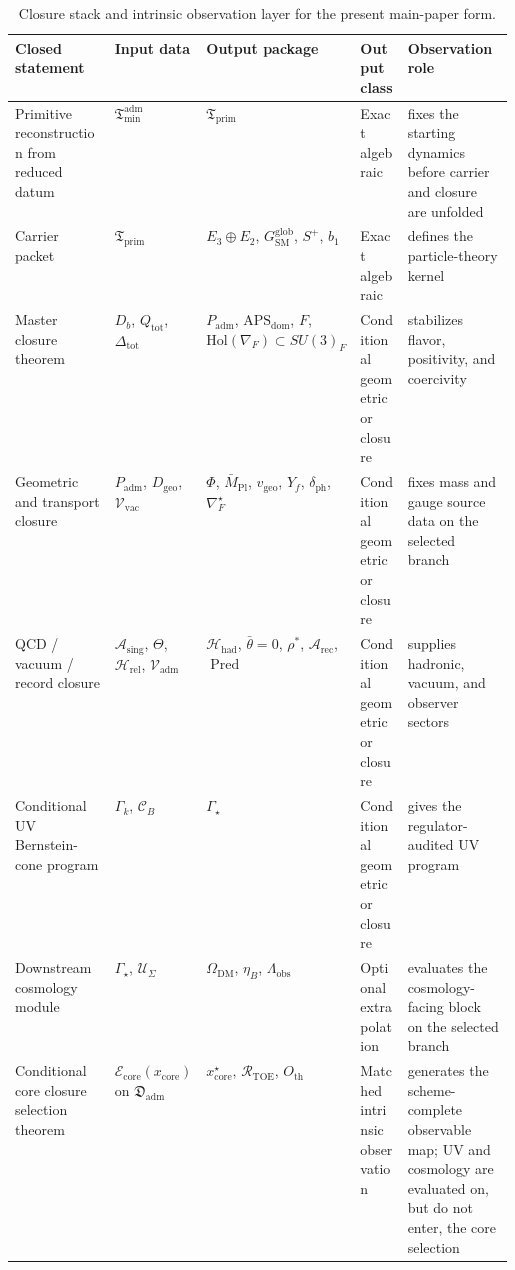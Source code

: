 \documentclass[11pt,a4paper]{article}
\theoremstyle{definition}
\theoremstyle{remark}
\newcommand{\Seam}{\Sigma}
\newcommand{\Mpl}{\bar M_{\mathrm{Pl}}}
\newcommand{\bone}{b_1}
\newcommand{\Arec}{\mathcal A_{\mathrm{rec}}}
\newcommand{\Asing}{\mathcal A_{\mathrm{sing}}}
\newcommand{\Vadm}{\mathcal V_{\mathrm{adm}}}
\newcommand{\Hrel}{\mathcal H_{\mathrm{rel}}}
\newcommand{\Hhad}{\mathcal H_{\mathrm{had}}}
\newcommand{\Pred}{\operatorname{Pred}}
\newcommand{\Tmin}{\mathfrak T_{\mathrm{min}}}
\newcommand{\Tprim}{\mathfrak T_{\mathrm{prim}}}
\newcommand{\APSdom}{\mathrm{APS}_{\mathrm{dom}}}
\newcommand{\vgeo}{v_{\mathrm{geo}}}
\newcommand{\Padm}{P_{\mathrm{adm}}}
\begin{document}
\begin{table}[t]
\centering
\small
\begin{tabularx}{\linewidth}{@{}>{\raggedright\arraybackslash}p{0.20\linewidth}>{\raggedright\arraybackslash}p{0.18\linewidth}>{\raggedright\arraybackslash}p{0.20\linewidth}YY@{}}
\toprule
Closed statement & Input data & Output package & Output class & Observation role \\
\midrule
Primitive reconstruction from reduced datum & $\Tmin^{\mathrm{adm}}$ & $\Tprim$ & Exact algebraic & fixes the starting dynamics before carrier and closure are unfolded \\
Carrier packet & $\Tprim$ & $E_3\oplus E_2$, $G_{\mathrm{SM}}^{\mathrm{glob}}$, $S^+$, $\bone$ & Exact algebraic & defines the particle-theory kernel \\
Master closure theorem & $D_b$, $Q_{\mathrm{tot}}$, $\Delta_{\mathrm{tot}}$ & $\Padm$, $\APSdom$, $F$, $\mathrm{Hol}(\nabla_F)\subset SU(3)_F$ & Conditional geometric or closure & stabilizes flavor, positivity, and coercivity \\
Geometric and transport closure & $\Padm$, $D_{\mathrm{geo}}$, $\mathcal V_{\mathrm{vac}}$ & $\Phi$, $\Mpl$, $\vgeo$, $Y_f$, $\delta_{\mathrm{ph}}$, $\nabla_F^\star$ & Conditional geometric or closure & fixes mass and gauge source data on the selected branch \\
QCD / vacuum / record closure & $\Asing$, $\Theta$, $\Hrel$, $\Vadm$ & $\Hhad$, $\bar\theta=0$, $\rho^\ast$, $\Arec$, $\Pred$ & Conditional geometric or closure & supplies hadronic, vacuum, and observer sectors \\
Conditional UV Bernstein-cone program & $\Gamma_k$, $\mathcal C_B$ & $\Gamma_\star$ & Conditional geometric or closure & gives the regulator-audited UV program \\
Downstream cosmology module & $\Gamma_\star$, $\mathcal U_\Seam$ & $\Omega_{\mathrm{DM}}$, $\eta_B$, $\Lambda_{\mathrm{obs}}$ & Optional extrapolation & evaluates the cosmology-facing block on the selected branch \\
Conditional core closure selection theorem & $\mathcal E_{\mathrm{core}}(x_{\mathrm{core}})$ on $\mathfrak D_{\mathrm{adm}}$ & $x_{\mathrm{core}}^\star$, $\mathcal R_{\mathrm{TOE}}$, $O_{\mathrm{th}}$ & Matched intrinsic observation & generates the scheme-complete observable map; UV and cosmology are evaluated on, but do not enter, the core selection \\
\bottomrule
\end{tabularx}
\caption{Closure stack and intrinsic observation layer for the present main-paper form.}
\label{tab:proof-obligations}
\end{table}
\end{document}

